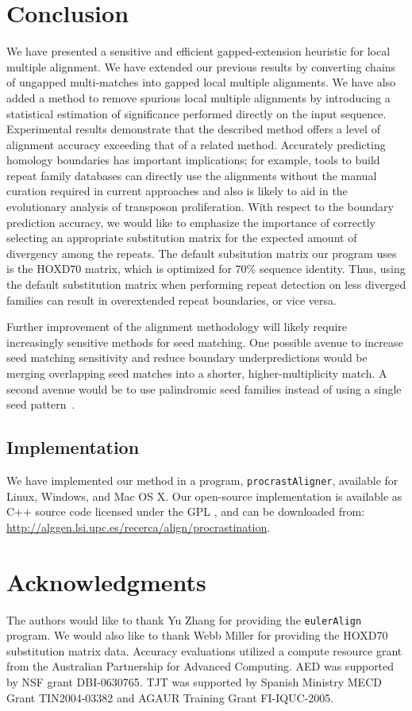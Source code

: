 \documentclass[9.5pt,journal,final,finalsubmission,twocolumn]{IEEEtran}
\begin{document}
\section{Conclusion}
We have presented a sensitive and efficient gapped-extension heuristic for local
multiple alignment. We have extended our previous results by
converting chains of ungapped multi-matches into gapped local multiple
alignments. We have also added a method to remove spurious local multiple alignments by introducing a statistical estimation of significance
performed directly on the input sequence.  Experimental results demonstrate that the
described method offers a level of alignment accuracy exceeding
that of a related method. Accurately predicting homology boundaries has important implications; for example, tools to build repeat family databases can directly use the alignments without the manual curation required in current approaches and also is likely to aid in the evolutionary analysis of transposon proliferation.  With respect to the boundary prediction accuracy, we would like to emphasize the importance of correctly selecting an appropriate substitution matrix for the expected amount of divergency among the repeats. The default subsitution matrix our program uses is the HOXD70 matrix, which is optimized for 70\% sequence identity. Thus, using the default substitution matrix when performing repeat detection on less diverged families can result in overextended repeat boundaries, or vice versa.

Further improvement of the alignment methodology will likely require increasingly sensitive methods for
seed matching. One possible avenue to increase seed matching sensitivity and reduce boundary underpredictions would be merging overlapping seed matches into a
shorter, higher-multiplicity match.  A second avenue would be to use palindromic seed families instead of using a single seed pattern~\cite{ref-pattern}.

\subsection{Implementation}
We have implemented our method in a program, \texttt{procrastAligner},
available for Linux, Windows, and Mac OS X. Our open-source
implementation is available as C++ source code licensed under the GPL , and can be downloaded from:
\url{http://alggen.lsi.upc.es/recerca/align/procrastination}.

\section{ Acknowledgments }
The authors would like to thank Yu Zhang for providing the
\texttt{eulerAlign} program. We would also like to thank
Webb Miller for providing the HOXD70 substitution matrix data. Accuracy
evaluations utilized a compute resource grant from the Australian
Partnership for Advanced Computing.  AED was supported by NSF grant
DBI-0630765. TJT was supported by Spanish Ministry MECD Grant
TIN2004-03382 and AGAUR Training Grant FI-IQUC-2005.
\end{document}
